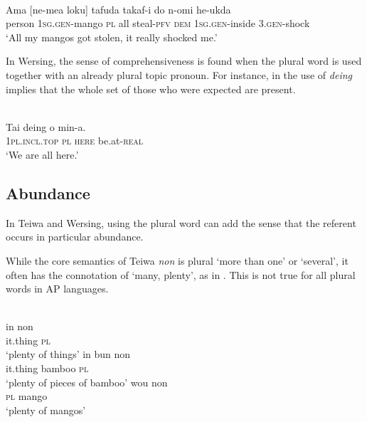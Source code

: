 \ea%
\label{ex:9:71}
 \\
\gll  Ama [ne-mea loku] tafuda takaf-i  do n-omi he-ukda \\
    person \textsc{1sg.gen-}mango \textsc{pl} all steal-\textsc{pfv}  \textsc{dem} \textsc{1sg.gen-}inside 3.\textsc{gen-}shock \\
\glt `All my mangos got stolen,  it really shocked me.' %
\z












In Wersing, the sense of comprehensiveness is found when the plural word is used together with an already plural topic pronoun. For instance, in  the use of \textit{deing} implies that the whole set of those who were expected are present.


\ea%
\label{ex:9:72}
 \\
\gll Tai deing o min-a.  \\
   \textsc{1pl.incl.top} \textsc{pl}   \textsc{here} be.at-\textsc{real}  \\
\glt `We are all here.'
\z






\subsection{Abundance} %
\label{sec:9:4.2}
In Teiwa and Wersing, using the plural word can add the sense that the referent occurs in particular abundance.

While the core semantics of Teiwa \textit{non} is plural `more than one' or `several', it often has the connotation of `many, plenty', as in . This is not true for all plural words in AP languages.


\ea%
\label{ex:9:73}
 \\
\ea
\gll  in  non\\
   it.thing  \textsc{pl} \\
   \glt `plenty of things' 
\ex
\gll in  bun non \\
it.thing bamboo \textsc{pl} \\
\glt `plenty of pieces of bamboo'
\ex 
\gll wou  non\\
\textsc{pl} mango\\
\glt  `plenty of mangos'
\z
\z

